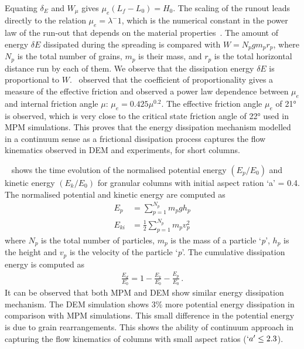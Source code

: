 Equating $\delta_E$ and $W_{\mu}$ gives $\mu_e (L_f - L_0) = H_0$. The scaling
of the runout leads directly to the relation $\mu_e = \lambda^-1$, which is the 
numerical constant in the power law of the run-out that depends on the material 
properties~\citep{Balmforth2005}. The amount of energy $\delta E$ dissipated 
during the spreading is compared with $W = N_p g m_p r_p$, where $N_p$ is the 
total number of grains, $m_p$ is their mass, and $r_p$ is the total horizontal 
distance run by each of them. We observe that the dissipation energy $\delta E$ 
is proportional to $W$.~\cite{Staron2007a} observed that the coefficient of 
proportionality gives a measure of the effective friction and 
observed a power law dependence between $\mu_e$ and internal friction angle 
$\mu$: $\mu_e=0.425\mu^{0.2}$. The effective friction angle $\mu_e$ of 
21\si{\degree} is observed, which is very close to the critical state friction 
angle of 22\si{\degree} used in MPM simulations. This proves that the energy 
dissipation mechanism modelled in a continuum sense as a frictional dissipation 
process captures the flow kinematics observed in DEM and experiments, for short 
columns.

~ shows the time evolution of the normalised potential energy 
$(E_{p}/E_0)$ and kinetic energy $(E_{k}/E_0)$ for granular columns with 
initial aspect ration `a' = 0.4. The normalised potential and kinetic energy 
are computed as
%
\begin{align}
E_p & = \sum\limits_{p=1}^{N_p}{m_p g h_p} \\
E_{ki} & = \frac{1}{2}\sum\limits_{p=1}^{N_p}{m_p v_p^2}
\end{align}
%
where $N_p$ is the total number of particles, $m_p$ is 
the mass of a particle `\textit{p}', $h_p$ is the height and 
$v_p$ is the velocity of the particle `\textit{p}'. The cumulative dissipation 
energy is computed as
%
\begin{align}
\frac{E_d}{E_0} = 1 - \frac{E_k}{E_0} - \frac{E_p}{E_0} \,.
\end{align}
%
It can be observed that both MPM and DEM show similar energy dissipation 
mechanism. The DEM simulation shows 3\% more potential energy dissipation in 
comparison with MPM simulations. This small difference in the potential energy 
is due to grain rearrangements. This shows the ability of continuum approach in 
capturing the flow kinematics of columns with small aspect ratios ($`a' \le 
2.3$). 

